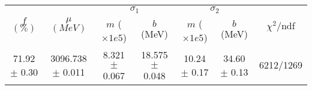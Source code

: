 \begin{tabular}{c|c|cc|cc||c}
 \multirow{2}{*}{$f$ $(\%)$} & \multirow{2}{*}{$\mu$ $(MeV)$} & \multicolumn{2}{|c|}{$\sigma_1$} & \multicolumn{2}{|c||}{$\sigma_2$} & \multirow{2}{*}{$\chi^2/$ndf} \\
 & & $m$ ($\times1e5$) & $b$ (MeV) & $m$ ($\times1e5$) & $b$ (MeV) & \\
\hline
71.92 $\pm$ 0.30 & 3096.738 $\pm$ 0.011 & 8.321 $\pm$ 0.067 & 18.575 $\pm$ 0.048 & 10.24 $\pm$ 0.17 & 34.60 $\pm$ 0.13 & 6212/1269\\
\end{tabular}
